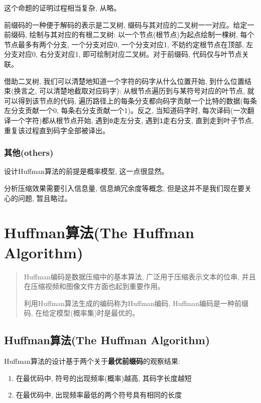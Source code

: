 \documentclass{article}
\begin{document}
\begin{CJK}{UTF8}{gbsn}
这个命题的证明过程相当复杂, 从略。

前缀码的一种便于解码的表示是二叉树, 缀码与其对应的二叉树一一对应。给定一前缀码, 绘制与其对应的有根二叉树: 以一个节点(根节点)为起点绘制一棵树, 每个节点最多有两个分支, 一个分支对应0, 一个分支对应1, 不妨约定根节点在顶部, 左分支对应0, 右分支对应1, 即可绘制对应二叉树。对于前缀码, 代码仅与叶节点关联。

借助二叉树, 我们可以清楚地知道一个字符的码字从什么位置开始, 到什么位置结束(换言之, 可以清楚地截取对应码字): 从根节点遍历到与某符号对应的叶节点, 就可以得到该节点的代码, 遍历路径上的每条分支都向码字贡献一个比特的数据(每条左分支贡献一个0, 每条右分支贡献一个1)。反之, 当知道码字时, 每次译码(一次翻译一个字符)都从根节点开始, 遇到\texttt{0}走左分支, 遇到\texttt{1}走右分支, 直到走到叶子节点, 重复该过程直到码字全部被译出。

\subsubsection{其他(others)}\label{header-n434}

设计Huffman算法的前提是概率模型, 这一点很显然。

分析压缩效果需要引入信息量, 信息熵冗余度等概念, 但是这并不是我们现在要关心的问题, 暂且略过。

\section{Huffman算法(The Huffman Algorithm)}\label{header-n437}

\begin{quote}
Huffman编码是数据压缩中的基本算法, 广泛用于压缩表示文本的位串, 并且在压缩视频和图像文件方面也起到重要作用。

利用Huffman算法生成的编码称为Huffman编码, Huffman编码是一种前缀码, 在给定模型(概率集)时是最优的。
\end{quote}

\subsection{Huffman算法(The Huffman Algorithm)}\label{header-n440}

Huffman算法的设计基于两个关于\textbf{最优前缀码}的观察结果:

\begin{enumerate}
\def\labelenumi{\arabic{enumi}.}
\item
  在最优码中, 符号的出现频率(概率)越高, 其码字长度越短
\item
  在最优码中, 出现频率最低的两个符号具有相同的长度
\end{enumerate}


\end{CJK}
\end{document}
